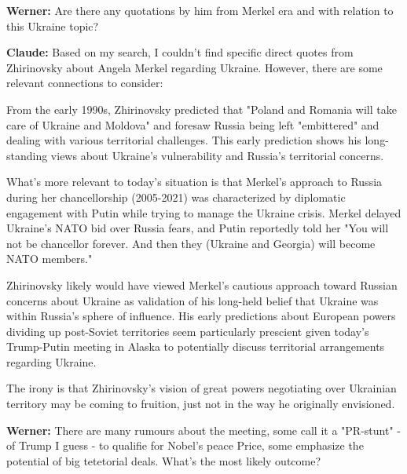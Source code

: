 \documentclass[11pt,a5paper]{scrartcl}
\begin{document}
\begin{humanbox}
\textbf{Werner:} Are there any quotations by him from Merkel era and with relation to this Ukraine topic?
\end{humanbox}

\begin{claudebox}
\textbf{Claude:} Based on my search, I couldn't find specific direct quotes from Zhirinovsky about Angela Merkel regarding Ukraine. However, there are some relevant connections to consider:

From the early 1990s, Zhirinovsky predicted that "Poland and Romania will take care of Ukraine and Moldova" and foresaw Russia being left "embittered" and dealing with various territorial challenges. This early prediction shows his long-standing views about Ukraine's vulnerability and Russia's territorial concerns.

What's more relevant to today's situation is that Merkel's approach to Russia during her chancellorship (2005-2021) was characterized by diplomatic engagement with Putin while trying to manage the Ukraine crisis. Merkel delayed Ukraine's NATO bid over Russia fears, and Putin reportedly told her "You will not be chancellor forever. And then they (Ukraine and Georgia) will become NATO members."

Zhirinovsky likely would have viewed Merkel's cautious approach toward Russian concerns about Ukraine as validation of his long-held belief that Ukraine was within Russia's sphere of influence. His early predictions about European powers dividing up post-Soviet territories seem particularly prescient given today's Trump-Putin meeting in Alaska to potentially discuss territorial arrangements regarding Ukraine.

The irony is that Zhirinovsky's vision of great powers negotiating over Ukrainian territory may be coming to fruition, just not in the way he originally envisioned.
\end{claudebox}

\begin{humanbox}
\textbf{Werner:} There are many rumours about the meeting, some call it a "PR-stunt" - of Trump I guess - to qualifie for Nobel's peace Price, some emphasize the potential of big tetetorial deals. What's the most likely outcome?
\end{humanbox}
\end{document}
